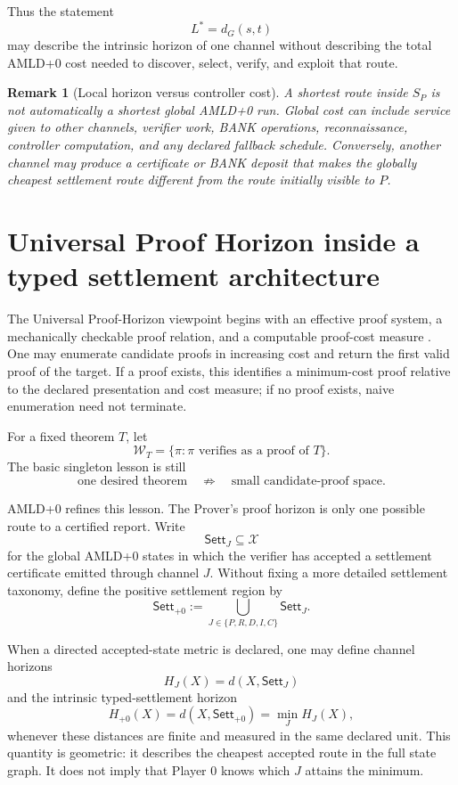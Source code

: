 \documentclass[11pt]{article}
\newtheorem{remark}[definition]{Remark}
\newcommand{\Wset}{\mathcal{W}}
\newcommand{\Sett}{\mathsf{Sett}}
\begin{document}
Thus the statement
\[
L^*=d_G(s,t)
\]
may describe the intrinsic horizon of one channel without describing the total
AMLD+0 cost needed to discover, select, verify, and exploit that route.

\begin{remark}[Local horizon versus controller cost]
A shortest route inside $S_P$ is not automatically a shortest global AMLD+0
run.  Global cost can include service given to other channels, verifier work,
BANK operations, reconnaissance, controller computation, and any declared
fallback schedule.  Conversely, another channel may produce a certificate or
BANK deposit that makes the globally cheapest settlement route different from
the route initially visible to $P$.
\end{remark}

\section{Universal Proof Horizon inside a typed settlement architecture}

The Universal Proof-Horizon viewpoint begins with an effective proof system, a
mechanically checkable proof relation, and a computable proof-cost measure
\cite{tenneson-uph}.  One may enumerate candidate proofs in increasing cost and
return the first valid proof of the target.  If a proof exists, this identifies
a minimum-cost proof relative to the declared presentation and cost measure;
if no proof exists, naive enumeration need not terminate.

For a fixed theorem $T$, let
\[
\Wset_T=\{\pi:\pi\text{ verifies as a proof of }T\}.
\]
The basic singleton lesson is still
\[
\text{one desired theorem}
\quad\not\Rightarrow\quad
\text{small candidate-proof space}.
\]

AMLD+0 refines this lesson.  The Prover's proof horizon is only one possible
route to a certified report.  Write
\[
\Sett_J\subseteq\mathcal X
\]
for the global AMLD+0 states in which the verifier has accepted a settlement
certificate emitted through channel $J$.  Without fixing a more detailed
settlement taxonomy, define the positive settlement region by
\[
\Sett_{+0}:=
\bigcup_{J\in\{P,R,D,I,C\}}\Sett_J.
\]

When a directed accepted-state metric is declared, one may define channel
horizons
\[
H_J(X)=d(X,\Sett_J)
\]
and the intrinsic typed-settlement horizon
\[
H_{+0}(X)=d(X,\Sett_{+0})
          =\min_J H_J(X),
\]
whenever these distances are finite and measured in the same declared unit.
This quantity is geometric: it describes the cheapest accepted route in the
full state graph.  It does not imply that Player 0 knows which $J$ attains the
minimum.
\end{document}
